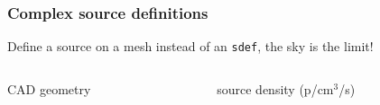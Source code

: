 \documentclass[xcolor=x11names,compress]{beamer}
\begin{document}
\begin{frame}
\frametitle{Complex source definitions}

Define a source on a mesh instead of an \texttt{sdef}, the sky is the limit!

\begin{columns}[T]
    \begin{column}{.4\textwidth}
     \begin{block}{CAD geometry}
     \vspace{0.1cm}
     \end{block}
    \end{column}
    \begin{column}{.45\textwidth}
    \begin{block}{source density (p/cm$^3$/s)}
    \end{block}
    \end{column}
\end{columns}

\end{frame}
\end{document}
